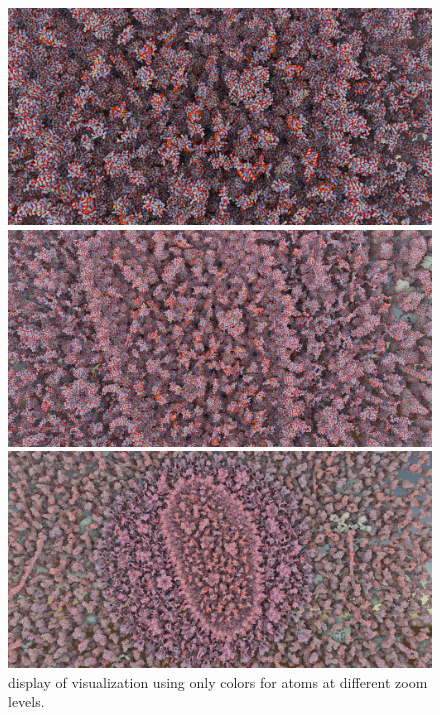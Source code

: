 \documentclass{article}
\begin{document}
	
	\begin{figure}[t]
		\centering
		\includegraphics[width=0.95\linewidth,keepaspectratio]{supplementaryMaterial/atomzoomedin} 
		
		\vspace{0.1cm}
		
		\includegraphics[width=0.95\linewidth,keepaspectratio]{supplementaryMaterial/atomzoomedmiddle} 
		
		\vspace{0.1cm}
		
		\includegraphics[width=0.9\linewidth,keepaspectratio]{supplementaryMaterial/atomzoomedhiv} 
		\caption{display of visualization using only colors for atoms at different zoom levels.}
	\end{figure}
	
\end{document}
